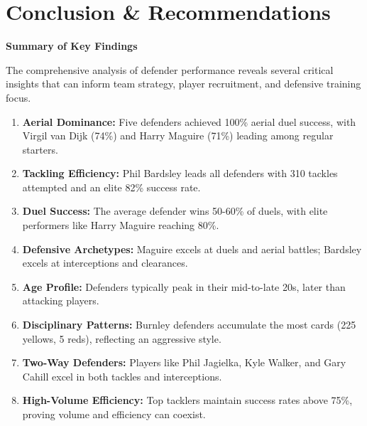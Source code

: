 \documentclass[12pt,a4paper]{article}
\begin{document}
\section{Conclusion \& Recommendations}

\begin{tcolorbox}[colback=lightgray, colframe=primary, arc=5pt, boxrule=1.5pt]
\centering
\textcolor{primary}{\textbf{\Large Summary of Key Findings}}
\end{tcolorbox}

\vspace{0.5cm}

\begin{tcolorbox}[colback=lightgray, colframe=secondary, arc=5pt, boxrule=1pt]
The comprehensive analysis of defender performance reveals several critical insights that can inform team strategy, player recruitment, and defensive training focus.
\end{tcolorbox}

\vspace{0.3cm}

\begin{enumerate}
    \item \textbf{Aerial Dominance:} Five defenders achieved 100\% aerial duel success, with Virgil van Dijk (74\%) and Harry Maguire (71\%) leading among regular starters.
    
    \item \textbf{Tackling Efficiency:} Phil Bardsley leads all defenders with 310 tackles attempted and an elite 82\% success rate.
    
    \item \textbf{Duel Success:} The average defender wins 50-60\% of duels, with elite performers like Harry Maguire reaching 80\%.
    
    \item \textbf{Defensive Archetypes:} Maguire excels at duels and aerial battles; Bardsley excels at interceptions and clearances.
    
    \item \textbf{Age Profile:} Defenders typically peak in their mid-to-late 20s, later than attacking players.
    
    \item \textbf{Disciplinary Patterns:} Burnley defenders accumulate the most cards (225 yellows, 5 reds), reflecting an aggressive style.
    
    \item \textbf{Two-Way Defenders:} Players like Phil Jagielka, Kyle Walker, and Gary Cahill excel in both tackles and interceptions.
    
    \item \textbf{High-Volume Efficiency:} Top tacklers maintain success rates above 75\%, proving volume and efficiency can coexist.
\end{enumerate}
\end{document}
